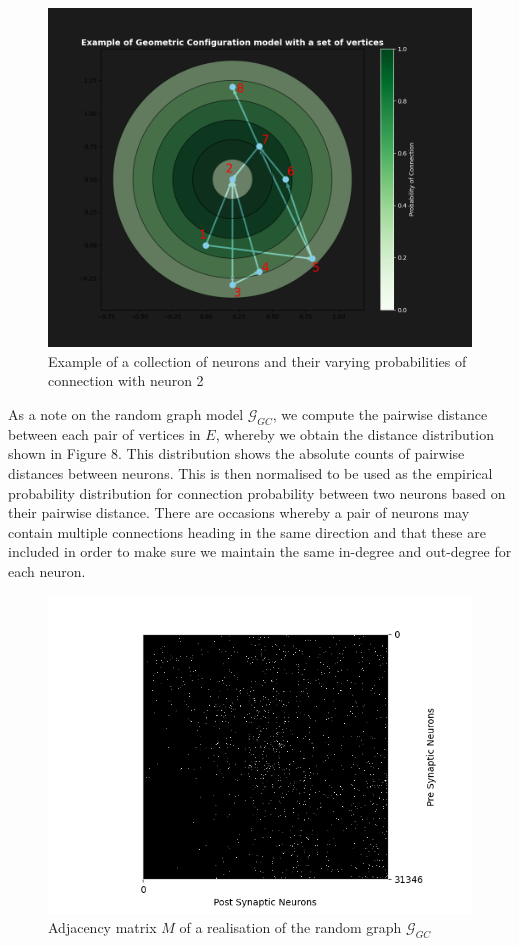 \begin{figure}[H]
\begin{center}
\includegraphics[width=12cm]{GC/gc_example.png}
\caption{Example of a collection of neurons and their varying probabilities of connection with neuron 2}
\end{center}
\end{figure}
As a note on the random graph model $\mathcal{G}_{GC}$, we compute the pairwise distance between each pair of vertices in $E$, whereby we obtain the distance distribution shown in Figure 8. This distribution shows the absolute counts of pairwise distances between neurons. This is then normalised to be used as the empirical probability distribution for connection probability between two neurons based on their pairwise distance.
There are occasions whereby a pair of neurons may contain multiple connections heading in the same direction and that these are included in order to make sure we maintain the same in-degree and out-degree for each neuron.
\begin{figure}[H]
\begin{center}
\captionsetup{justification=centering}
\includegraphics[width=12cm]{GC/matrix_GC.png}
\caption{Adjacency matrix $M$ of a realisation of the random graph $\mathcal{G}_{GC}$}
\end{center}
\end{figure}
